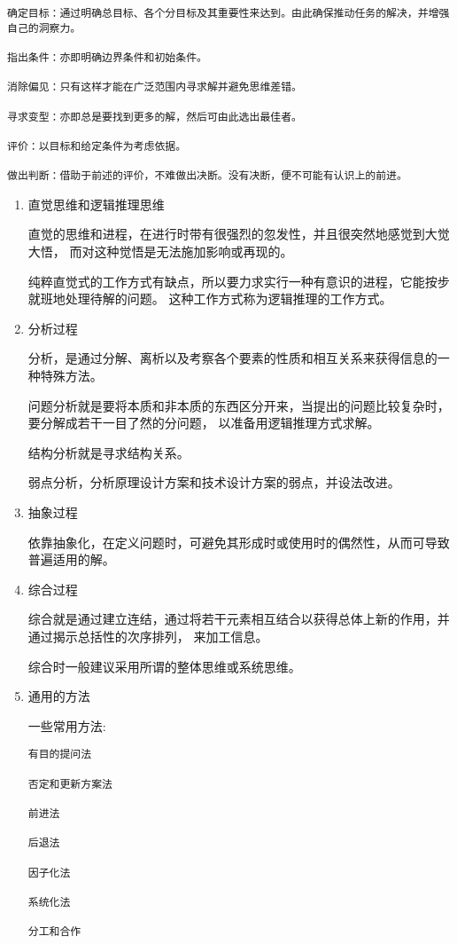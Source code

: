 \documentclass[letterpaper,10pt,english]{sphinxmanual}
\begin{document}
\begin{Verbatim}[commandchars=\\\{\}]
确定目标：通过明确总目标、各个分目标及其重要性来达到。由此确保推动任务的解决，并增强自己的洞察力。

指出条件：亦即明确边界条件和初始条件。

消除偏见：只有这样才能在广泛范围内寻求解并避免思维差错。

寻求变型：亦即总是要找到更多的解，然后可由此选出最佳者。

评价：以目标和给定条件为考虑依据。

做出判断：借助于前述的评价，不难做出决断。没有决断，便不可能有认识上的前进。
\end{Verbatim}
\begin{enumerate}
\item {} 
直觉思维和逻辑推理思维

直觉的思维和进程，在进行时带有很强烈的忽发性，并且很突然地感觉到大觉大悟，
而对这种觉悟是无法施加影响或再现的。

纯粹直觉式的工作方式有缺点，所以要力求实行一种有意识的进程，它能按步就班地处理待解的问题。
这种工作方式称为逻辑推理的工作方式。

\item {} 
分析过程

分析，是通过分解、离析以及考察各个要素的性质和相互关系来获得信息的一种特殊方法。

问题分析就是要将本质和非本质的东西区分开来，当提出的问题比较复杂时，要分解成若干一目了然的分问题，
以准备用逻辑推理方式求解。

结构分析就是寻求结构关系。

弱点分析，分析原理设计方案和技术设计方案的弱点，并设法改进。

\item {} 
抽象过程

依靠抽象化，在定义问题时，可避免其形成时或使用时的偶然性，从而可导致普遍适用的解。

\item {} 
综合过程

综合就是通过建立连结，通过将若干元素相互结合以获得总体上新的作用，并通过揭示总括性的次序排列，
来加工信息。

综合时一般建议采用所谓的整体思维或系统思维。

\item {} 
通用的方法

一些常用方法:

\begin{Verbatim}[commandchars=\\\{\}]
有目的提问法

否定和更新方案法

前进法

后退法

因子化法

系统化法

分工和合作
\end{Verbatim}

\end{enumerate}
\end{document}
